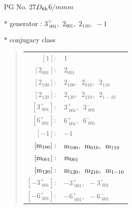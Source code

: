 \documentclass[fleqn,8pt]{jsarticle}
\begin{document}
\setcounter{MaxMatrixCols}{32}

\renewcommand{\tablename}{Table~}
\renewcommand{\figurename}{Figure~}
\begin{center}
\LARGE
PG No. 27\quad$D_{\rm 6h}$\quad$6/mmm$\quad[ hexagonal ]
\end{center}

* generator : $3^{+}_{\,\,001},\,\,2{}_{001},\,\,2{}_{110},\,\,-1$

* conjugacy class
\begin{quote}
\begin{tabular}{rl}
$ [1]: $ & $ 1 $ \\
$ [2{}_{001}]: $ & $ 2{}_{001} $ \\
$ [2{}_{100}]: $ & $ 2{}_{100},\,\,\,2{}_{010},\,\,\,2{}_{110} $ \\
$ [2{}_{120}]: $ & $ 2{}_{120},\,\,\,2{}_{210},\,\,\,2{}_{1-10} $ \\
$ [3^{+}_{\,\,001}]: $ & $ 3^{+}_{\,\,001},\,\,\,3^{-}_{\,\,001} $ \\
$ [6^{+}_{\,\,001}]: $ & $ 6^{+}_{\,\,001},\,\,\,6^{-}_{\,\,001} $ \\
$ [-1]: $ & $ -1 $ \\
$ [{\rm m}_{100}]: $ & $ {\rm m}_{100},\,\,\,{\rm m}_{010},\,\,\,{\rm m}_{110} $ \\
$ [{\rm m}_{001}]: $ & $ {\rm m}_{001} $ \\
$ [{\rm m}_{120}]: $ & $ {\rm m}_{120},\,\,\,{\rm m}_{210},\,\,\,{\rm m}_{1-10} $ \\
$ [-3^{+}_{\,\,001}]: $ & $ -3^{+}_{\,\,001},\,\,\,-3^{-}_{\,\,001} $ \\
$ [-6^{+}_{\,\,001}]: $ & $ -6^{+}_{\,\,001},\,\,\,-6^{-}_{\,\,001} $
\end{tabular}
\end{quote}
\end{document}
